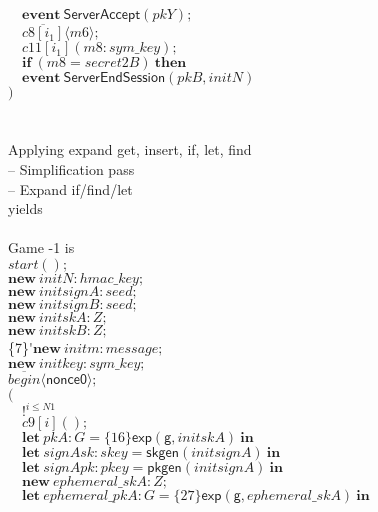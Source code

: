\documentclass{article}
\newcommand{\cinput}[2]{{#1}({#2})}
\newcommand{\coutput}[2]{\overline{#1}\langle{#2}\rangle}
\newcommand{\kw}[1]{\mathbf{#1}}
\newcommand{\kwf}[1]{\mathsf{#1}}
\newcommand{\var}[1]{\mathit{#1}}
\newcommand{\kwt}[1]{\mathit{#1}}
\newcommand{\kwp}[1]{\mathit{#1}}
\newcommand{\kwc}[1]{\mathit{#1}}
\begin{document}
\begin{tabbing}
\>$\quad \kw{event}\ \kwf{ServerAccept}(\var{pkY});$\\
\>$\quad \coutput{\kwc{c8}[\var{i}_{1}]}{\var{m6}};$\\
\>$\quad \cinput{\kwc{c11}[\var{i}_{1}]}{\var{m8}: \kwt{sym{\_}key}};$\\
\>$\quad \kw{if}\ (\var{m8}  =  \var{secret2B})\ \kw{then}$\\
\>$\quad \kw{event}\ \kwf{ServerEndSession}(\var{pkB}, \var{initN})$\\
\>$)$\\
\\
\\
Applying expand get, insert, if, let, find\\
\quad -- Simplification pass\\
\quad -- Expand if/find/let\\
yields\\
\\
Game -1 is\\
\>$\cinput{\kwc{start}}{};$\\
\>$\kw{new}\ \var{initN}: \kwt{hmac{\_}key};$\\
\>$\kw{new}\ \var{initsignA}: \kwt{seed};$\\
\>$\kw{new}\ \var{initsignB}: \kwt{seed};$\\
\>$\kw{new}\ \var{initskA}: \kwt{Z};$\\
\>$\kw{new}\ \var{initskB}: \kwt{Z};$\\
\>\{7\}\'$\kw{new}\ \var{initm}: \kwt{message};$\\
\>$\kw{new}\ \var{initkey}: \kwt{sym{\_}key};$\\
\>$\coutput{\kwc{begin}}{\kwf{nonce0}};$\\
\>$($\\
\>$\quad !^{\var{i} \leq \kwp{N1}}$\\
\>$\quad \cinput{\kwc{c9}[\var{i}]}{};$\\
\>$\quad \kw{let}\ \var{pkA}: \kwt{G} = \{16\}\kwf{exp}(\kwf{g}, \var{initskA})\ \kw{in}$\\
\>$\quad \kw{let}\ \var{signAsk}: \kwt{skey} = \kwf{skgen}(\var{initsignA})\ \kw{in}$\\
\>$\quad \kw{let}\ \var{signApk}: \kwt{pkey} = \kwf{pkgen}(\var{initsignA})\ \kw{in}$\\
\>$\quad \kw{new}\ \var{ephemeral{\_}skA}: \kwt{Z};$\\
\>$\quad \kw{let}\ \var{ephemeral{\_}pkA}: \kwt{G} = \{27\}\kwf{exp}(\kwf{g}, \var{ephemeral{\_}skA})\ \kw{in}$\\

\end{tabbing}
\end{document}
